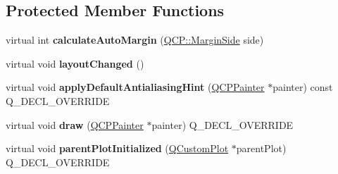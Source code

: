 \subsection*{Protected Member Functions}
\begin{DoxyCompactItemize}
\item 
\mbox{\label{class_q_c_p_layout_element_a005c9f0fe84bc1591a2cf2c46fd477b4}} 
virtual int {\bfseries calculate\+Auto\+Margin} (\hyperlink{namespace_q_c_p_a7e487e3e2ccb62ab7771065bab7cae54}{Q\+C\+P\+::\+Margin\+Side} side)
\item 
\mbox{\label{class_q_c_p_layout_element_a765f041a73af0c2de41b41a5a03e31a4}} 
virtual void {\bfseries layout\+Changed} ()
\item 
\mbox{\label{class_q_c_p_layout_element_a0a8f18141bcf46cf40ad4c13324ff346}} 
virtual void {\bfseries apply\+Default\+Antialiasing\+Hint} (\hyperlink{class_q_c_p_painter}{Q\+C\+P\+Painter} $\ast$painter) const Q\+\_\+\+D\+E\+C\+L\+\_\+\+O\+V\+E\+R\+R\+I\+DE
\item 
\mbox{\label{class_q_c_p_layout_element_ad1c597b1d608cfdd86e7b76819a94cfb}} 
virtual void {\bfseries draw} (\hyperlink{class_q_c_p_painter}{Q\+C\+P\+Painter} $\ast$painter) Q\+\_\+\+D\+E\+C\+L\+\_\+\+O\+V\+E\+R\+R\+I\+DE
\item 
\mbox{\label{class_q_c_p_layout_element_ab4bb5c5a958451f5f153fdce350f13cf}} 
virtual void {\bfseries parent\+Plot\+Initialized} (\hyperlink{class_q_custom_plot}{Q\+Custom\+Plot} $\ast$parent\+Plot) Q\+\_\+\+D\+E\+C\+L\+\_\+\+O\+V\+E\+R\+R\+I\+DE
\end{DoxyCompactItemize}
